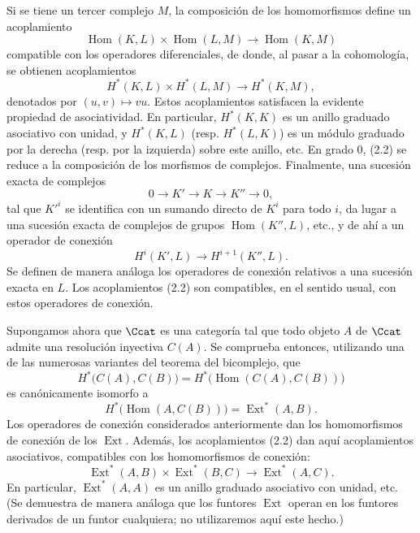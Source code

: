 Si se tiene un tercer complejo $M$, la composición de los homomorfismos
define un acoplamiento
\[
  \operatorname{Hom}(K,L)\times\operatorname{Hom}(L,M)
  \longrightarrow\operatorname{Hom}(K,M)
\]
compatible con los operadores diferenciales, de donde, al pasar a la cohomología,
se obtienen acoplamientos
\begin{equation}\tag{2.2}
  H^{*}(K,L)\times H^{*}(L,M)\longrightarrow H^{*}(K,M),
\end{equation}
denotados por $(u,v)\longmapsto vu$. Estos acoplamientos satisfacen la evidente propiedad
de asociatividad. En particular, $H^{*}(K,K)$ es un anillo graduado asociativo
con unidad, y $H^{*}(K,L)$ (resp. $H^{*}(L,K)$) es un módulo graduado por la derecha
(resp. por la izquierda) sobre este anillo, etc. En grado $0$, (2.2) se reduce a la
composición de los morfismos de complejos. Finalmente, una sucesión exacta de
complejos
\[
  0\longrightarrow K'\longrightarrow K\longrightarrow K''\longrightarrow 0,
\]
tal que $K'^{i}$ se identifica con un sumando directo de $K^{i}$ para todo $i$,
da lugar a una sucesión exacta de complejos de grupos
$\operatorname{Hom}(K'',L)$, etc., y de ahí a un operador de conexión
\[
  H^{i}(K',L)\longrightarrow H^{i+1}(K'',L).
\]
Se definen de manera análoga los operadores de conexión relativos a una sucesión exacta en $L$. Los
acoplamientos (2.2) son compatibles, en el sentido usual, con estos operadores de conexión.

Supongamos ahora que $\Ccat$ es una categoría tal que todo objeto $A$
de $\Ccat$ admite una resolución inyectiva $C(A)$. Se comprueba entonces, utilizando
una de las numerosas variantes del teorema del bicomplejo, que
\[
  H^{*}\bigl(C(A),C(B)\bigr)
  =H^{*}\bigl(\operatorname{Hom}(C(A),C(B))\bigr)
\]
es canónicamente isomorfo a
\[
  H^{*}\bigl(\operatorname{Hom}(A,C(B))\bigr)
  =\operatorname{Ext}^{*}(A,B).
\]
Los operadores de conexión considerados anteriormente dan los homomorfismos de conexión de los
$\operatorname{Ext}$. Además, los acoplamientos (2.2) dan aquí
acoplamientos asociativos, compatibles con los homomorfismos de conexión:
\begin{equation}\tag{2.3}
  \operatorname{Ext}^{*}(A,B)\times\operatorname{Ext}^{*}(B,C)
  \longrightarrow\operatorname{Ext}^{*}(A,C).
\end{equation}
En particular, $\operatorname{Ext}^{*}(A,A)$ es un anillo graduado asociativo
con unidad, etc. (Se demuestra de manera análoga que los funtores
$\operatorname{Ext}$ operan en los funtores derivados de un funtor
cualquiera; no utilizaremos aquí este hecho.)

